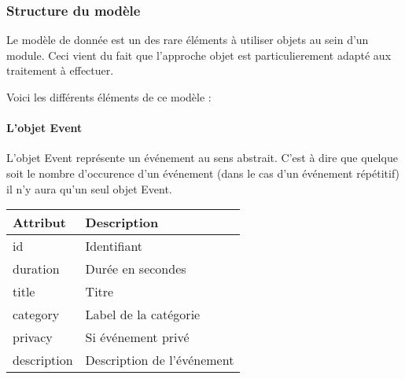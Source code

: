 \subsubsection{Structure du modèle}
 Le modèle de donnée est un des rare éléments à utiliser objets au sein d'un
 module. Ceci vient du fait que l'approche objet est particulierement adapté aux
 traitement à effectuer.

 Voici les différents éléments de ce modèle :
\paragraph{L'objet Event}
 L'objet Event représente un événement au sens abstrait.
 C'est à dire que quelque soit le nombre d'occurence d'un événement (dans le cas
 d'un événement répétitif) il n'y aura qu'un seul objet Event.

 \begin{tabular}{|l|p{9.5cm}|}
  \hline
   \textbf{Attribut} & \textbf{Description} \\
  \hline
   id & Identifiant \\
  \hline
   duration & Durée en secondes \\
  \hline
   title & Titre \\
  \hline
   category & Label de la catégorie \\
  \hline
   privacy & Si événement privé \\
  \hline
   description & Description de l'événement \\
  \hline
 \end{tabular}

